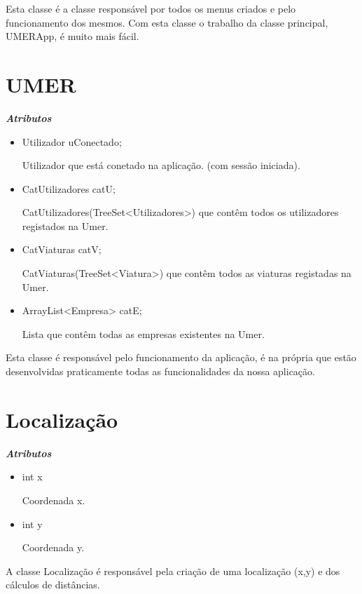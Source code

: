 \documentclass[12pt,a4paper]{report}
\begin{document}
Esta classe é a classe responsável por todos os menus criados e pelo funcionamento dos mesmos. Com esta classe o trabalho da classe principal, UMERApp, é muito mais fácil.


\section{UMER}
\emph{\bfseries Atributos}

\begin{itemize}
    \item Utilizador uConectado; \par
Utilizador que está conetado na aplicação. (com sessão iniciada).
    \item CatUtilizadores catU; \par
CatUtilizadores(TreeSet<Utilizadores>) que contêm todos os utilizadores registados na Umer.
    \item CatViaturas catV; \par
CatViaturas(TreeSet<Viatura>) que contêm todos as viaturas registadas na Umer.
    \item ArrayList<Empresa> catE; \par
Lista que contêm todas as empresas existentes na Umer.
\end{itemize}

Esta classe é responsável pelo funcionamento da aplicação, é na própria que estão desenvolvidas praticamente todas as funcionalidades da nossa aplicação.

\section{Localização}
\emph{\bfseries Atributos}
\begin{itemize}
    \item int x \par
Coordenada x.
    \item int y \par
Coordenada y.
\end{itemize}
A classe Localização é responsável pela criação de uma localização (x,y) e dos cálculos de distâncias.
\end{document}
